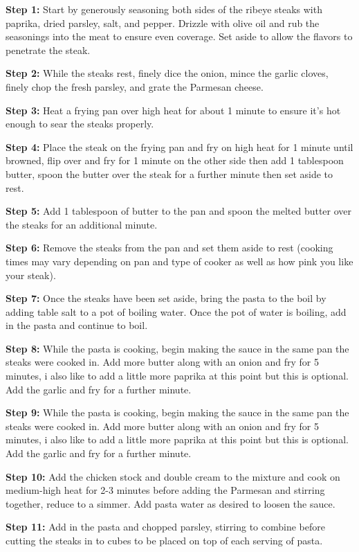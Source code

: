 \documentclass[
]{book}
\begin{document}
\textbf{Step 1:} Start by generously seasoning both sides of the ribeye
steaks with paprika, dried parsley, salt, and pepper. Drizzle with olive
oil and rub the seasonings into the meat to ensure even coverage. Set
aside to allow the flavors to penetrate the steak.

\textbf{Step 2:} While the steaks rest, finely dice the onion, mince the
garlic cloves, finely chop the fresh parsley, and grate the Parmesan
cheese.

\textbf{Step 3:} Heat a frying pan over high heat for about 1 minute to
ensure it's hot enough to sear the steaks properly.

\textbf{Step 4:} Place the steak on the frying pan and fry on high heat
for 1 minute until browned, flip over and fry for 1 minute on the other
side then add 1 tablespoon butter, spoon the butter over the steak for a
further minute then set aside to rest.

\textbf{Step 5:} Add 1 tablespoon of butter to the pan and spoon the
melted butter over the steaks for an additional minute.

\textbf{Step 6:} Remove the steaks from the pan and set them aside to
rest (cooking times may vary depending on pan and type of cooker as well
as how pink you like your steak).

\textbf{Step 7:} Once the steaks have been set aside, bring the pasta to
the boil by adding table salt to a pot of boiling water. Once the pot of
water is boiling, add in the pasta and continue to boil.

\textbf{Step 8:} While the pasta is cooking, begin making the sauce in
the same pan the steaks were cooked in. Add more butter along with an
onion and fry for 5 minutes, i also like to add a little more paprika at
this point but this is optional. Add the garlic and fry for a further
minute.

\textbf{Step 9:} While the pasta is cooking, begin making the sauce in
the same pan the steaks were cooked in. Add more butter along with an
onion and fry for 5 minutes, i also like to add a little more paprika at
this point but this is optional. Add the garlic and fry for a further
minute.

\textbf{Step 10:} Add the chicken stock and double cream to the mixture
and cook on medium-high heat for 2-3 minutes before adding the Parmesan
and stirring together, reduce to a simmer. Add pasta water as desired to
loosen the sauce.

\textbf{Step 11:} Add in the pasta and chopped parsley, stirring to
combine before cutting the steaks in to cubes to be placed on top of
each serving of pasta.
\end{document}
